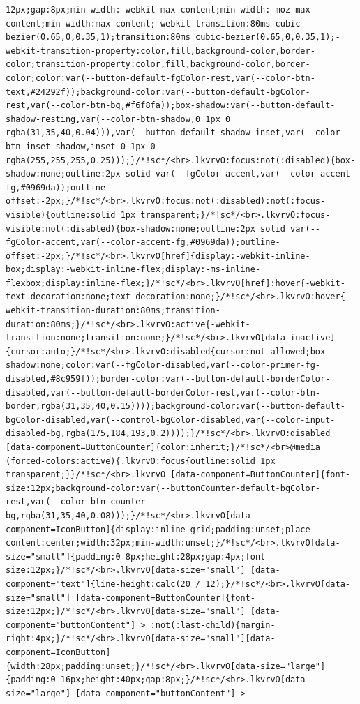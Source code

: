 \documentclass[
  letterpaper,
]{book}
\begin{document}
\begin{verbatim}
12px;gap:8px;min-width:-webkit-max-content;min-width:-moz-max-content;min-width:max-content;-webkit-transition:80ms cubic-bezier(0.65,0,0.35,1);transition:80ms cubic-bezier(0.65,0,0.35,1);-webkit-transition-property:color,fill,background-color,border-color;transition-property:color,fill,background-color,border-color;color:var(--button-default-fgColor-rest,var(--color-btn-text,#24292f));background-color:var(--button-default-bgColor-rest,var(--color-btn-bg,#f6f8fa));box-shadow:var(--button-default-shadow-resting,var(--color-btn-shadow,0 1px 0 rgba(31,35,40,0.04))),var(--button-default-shadow-inset,var(--color-btn-inset-shadow,inset 0 1px 0 rgba(255,255,255,0.25)));}/*!sc*/<br>.lkvrvO:focus:not(:disabled){box-shadow:none;outline:2px solid var(--fgColor-accent,var(--color-accent-fg,#0969da));outline-offset:-2px;}/*!sc*/<br>.lkvrvO:focus:not(:disabled):not(:focus-visible){outline:solid 1px transparent;}/*!sc*/<br>.lkvrvO:focus-visible:not(:disabled){box-shadow:none;outline:2px solid var(--fgColor-accent,var(--color-accent-fg,#0969da));outline-offset:-2px;}/*!sc*/<br>.lkvrvO[href]{display:-webkit-inline-box;display:-webkit-inline-flex;display:-ms-inline-flexbox;display:inline-flex;}/*!sc*/<br>.lkvrvO[href]:hover{-webkit-text-decoration:none;text-decoration:none;}/*!sc*/<br>.lkvrvO:hover{-webkit-transition-duration:80ms;transition-duration:80ms;}/*!sc*/<br>.lkvrvO:active{-webkit-transition:none;transition:none;}/*!sc*/<br>.lkvrvO[data-inactive]{cursor:auto;}/*!sc*/<br>.lkvrvO:disabled{cursor:not-allowed;box-shadow:none;color:var(--fgColor-disabled,var(--color-primer-fg-disabled,#8c959f));border-color:var(--button-default-borderColor-disabled,var(--button-default-borderColor-rest,var(--color-btn-border,rgba(31,35,40,0.15))));background-color:var(--button-default-bgColor-disabled,var(--control-bgColor-disabled,var(--color-input-disabled-bg,rgba(175,184,193,0.2))));}/*!sc*/<br>.lkvrvO:disabled [data-component=ButtonCounter]{color:inherit;}/*!sc*/<br>@media (forced-colors:active){.lkvrvO:focus{outline:solid 1px transparent;}}/*!sc*/<br>.lkvrvO [data-component=ButtonCounter]{font-size:12px;background-color:var(--buttonCounter-default-bgColor-rest,var(--color-btn-counter-bg,rgba(31,35,40,0.08)));}/*!sc*/<br>.lkvrvO[data-component=IconButton]{display:inline-grid;padding:unset;place-content:center;width:32px;min-width:unset;}/*!sc*/<br>.lkvrvO[data-size="small"]{padding:0 8px;height:28px;gap:4px;font-size:12px;}/*!sc*/<br>.lkvrvO[data-size="small"] [data-component="text"]{line-height:calc(20 / 12);}/*!sc*/<br>.lkvrvO[data-size="small"] [data-component=ButtonCounter]{font-size:12px;}/*!sc*/<br>.lkvrvO[data-size="small"] [data-component="buttonContent"] > :not(:last-child){margin-right:4px;}/*!sc*/<br>.lkvrvO[data-size="small"][data-component=IconButton]{width:28px;padding:unset;}/*!sc*/<br>.lkvrvO[data-size="large"]{padding:0 16px;height:40px;gap:8px;}/*!sc*/<br>.lkvrvO[data-size="large"] [data-component="buttonContent"] > 
\end{verbatim}
\end{document}
